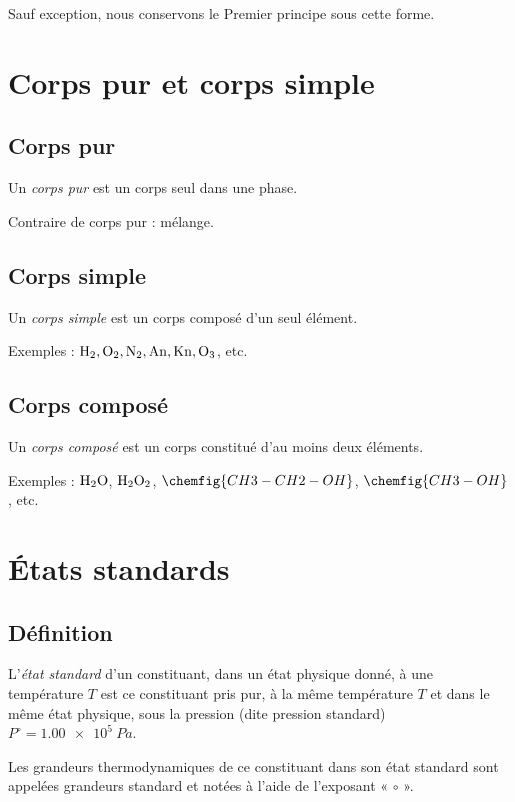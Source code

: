 \documentclass{article}
\begin{document}
    Sauf exception, nous conservons le Premier principe sous cette forme.
    
\section{Corps pur et corps simple}
\subsection{Corps pur}
\begin{enonce}
    Un \textit{corps pur} est un corps seul dans une phase.
\end{enonce}
\begin{tableau}
    Contraire de corps pur : mélange.
\end{tableau}
\subsection{Corps simple}
\begin{enonce}
    Un \textit{corps simple} est un corps composé d’un seul élément.
\end{enonce}
\begin{tableau}
    Exemples : $\ce{H2, O2, N2, An, Kn, O3}$, etc.
\end{tableau}
\subsection{Corps composé}
\begin{enonce}
    Un \textit{corps composé} est un corps constitué d’au moins deux éléments.
\end{enonce}
\begin{tableau}
    Exemples : $\ce{H2O}$, $\ce{H2O2}$, $\chemfig{CH3-CH2-OH}$, $\chemfig{CH3-OH}$, etc. 
\end{tableau}
\section{États standards}
\subsection{Définition}
\begin{enonce}
    L’\textit{état standard} d’un constituant, dans un état physique donné, à une température $T$ est ce constituant pris pur, à la même température $T$ et dans le même état physique, sous la pression (dite pression standard) $P^\circ = \SI{1,00e5}{Pa}$.
\end{enonce}
Les grandeurs thermodynamiques de ce constituant dans son état standard sont appelées grandeurs standard et notées à l’aide de l’exposant « $\circ$ ».\\
\end{document}
